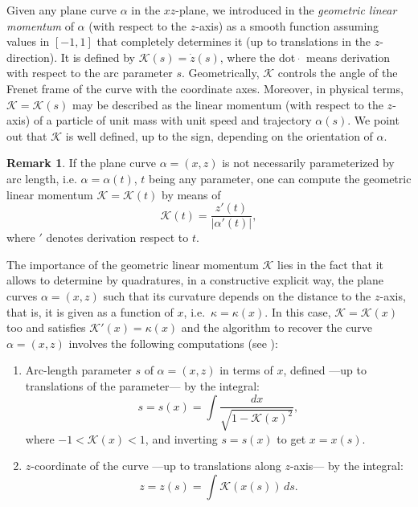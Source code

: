 \documentclass[leqno,11pt]{amsart}
\theoremstyle{definition}
\newtheorem{remark}[theorem]{Remark}
\numberwithin{equation}{section}
\begin{document}
Given any plane curve  $\alpha$ in the $xz$-plane, we introduced in \cite[Section 2]{CC22} the \textit{geometric linear momentum} of $\alpha $ (with respect to the $z$-axis) as a smooth function assuming values in $[-1,1]$ that completely determines it (up to translations in the $z$-direction). 
It is defined by $\mathcal K(s)= \dot z (s)$, where the dot $\, \dot{}\, $ means derivation with respect to the arc parameter $s$. Geometrically, $\mathcal K$ controls the angle of the Frenet frame of the curve with the coordinate axes. 
Moreover, in physical terms, $\mathcal K= \mathcal K (s)$ may be described as the linear momentum (with respect to the $z$-axis) of a particle of unit mass with unit speed and trajectory $\alpha (s)$.
We point out that $\mathcal K$  is well defined, up to the sign, depending on the orientation of $\alpha$.
\begin{remark}\label{re:no ppa}
	If the plane curve $\alpha=(x,z)$ is not necessarily parameterized by arc length, i.e. $\alpha = \alpha (t)$, $t$ being any parameter, one can compute the geometric linear momentum $\mathcal K = \mathcal K (t)$ by means of
	$$
	\mathcal K (t)= \frac{z'(t)}{|\alpha ' (t)|},
	$$
	where $'$ denotes derivation respect to $t$.
\end{remark}
The importance of the geometric linear momentum $\mathcal K$ lies in the fact that it allows to determine by quadratures, in a constructive explicit way, the plane curves $\alpha=(x,z)$ such that its curvature depends on the distance to the $z$-axis, that is, it is given as a function of $x$, i.e.\ $\kappa=\kappa(x)$. In this case, $\mathcal K = \mathcal K (x)$ too and satisfies $\mathcal K'(x)=\kappa (x)$ and
the algorithm to recover the curve $\alpha=(x,z)$ involves the following computations (see \cite[Remark 2]{CC22}):
\begin{enumerate}[\rm (i)]
	\item[\rm (i)] Arc-length parameter $s$ of $\alpha=(x,z) $ in terms of $x$, defined ---up to translations of the parameter--- by the integral:
\begin{equation}\label{eq:s(x)}
	s=s(x)=\int\!\frac{dx}{\sqrt{1-\mathcal K(x)^2}},
\end{equation}
	where $-1<\mathcal K(x)<1$, and
	inverting $s=s(x)$ to get $x=x(s)$. 
	\item[\rm (ii)] $z$-coordinate of the curve ---up to translations along $z$-axis--- by the integral:
\begin{equation}\label{eq:z(s)}
	z=z (s)=\int \! \mathcal K(x(s))\, ds .
\end{equation}
\end{enumerate}
\end{document}
